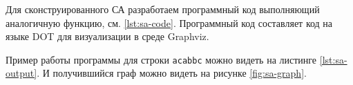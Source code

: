 \begin{table}[H]
    \centering
    \caption{Сконструированный СА}
    \label{tab:constracted-sa}
\end{table}

Для сконструированного СА разработаем программный код выполняющий аналогичную функцию, см. \ref{lst:sa-code}. Программный код составляет код на языке DOT для визуализации в среде Graphviz.



Пример работы программы для строки \verb|acabbc| можно видеть на листинге \ref{lst:sa-output}. И получившийся граф можно видеть на рисунке \ref{fig:sa-graph}.


